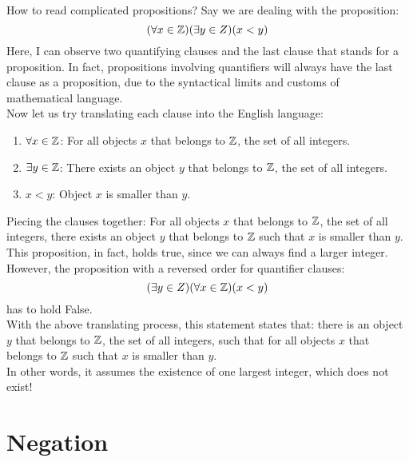\begin{ln-think}{How to read complicated propositions?}{}
    Say we are dealing with the proposition:
    \[(\forall x \in \mathbb{Z})(\exists y \in Z)(x < y)\]
    Here, I can observe two quantifying clauses and the last clause that stands for a proposition. In fact, propositions involving quantifiers will always have the last clause as a proposition, due to the syntactical limits and customs of mathematical language. \\
    Now let us try translating each clause into the English language:
    \begin{enumerate}
        \item $\forall x \in \mathbb{Z}$: For all objects $x$ that belongs to $\mathbb{Z}$, the set of all integers.
        \item $\exists y \in \mathbb{Z}$: There exists an object $y$ that belongs to $\mathbb{Z}$, the set of all integers.
        \item $x < y$: Object $x$ is smaller than $y$.
    \end{enumerate}
    Piecing the clauses together: For all objects $x$ that belongs to $\mathbb{Z}$, the set of all integers, there exists an object $y$ that belongs to $\mathbb{Z}$ such that $x$ is smaller than $y$. \\
    This proposition, in fact, holds true, since we can always find a larger integer. \\
    However, the proposition with a reversed order for quantifier clauses:
    \[(\exists y \in Z)(\forall x \in \mathbb{Z})(x < y)\]
    has to hold False. \\

    With the above translating process, this statement states that: there is an object $y$ that belongs to $\mathbb{Z}$, the set of all integers, such that for all objects $x$ that belongs to $\mathbb{Z}$ such that $x$ is smaller than $y$. \\
    In other words, it assumes the existence of one largest integer, which does not exist!
\end{ln-think}

\section{Negation}
